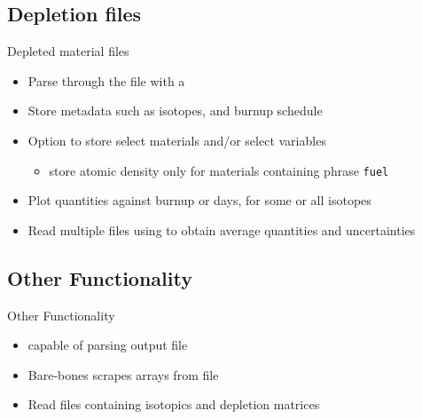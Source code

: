 \subsection{Depletion files}
\begin{frame}{Depleted material files}
    \begin{itemize}
        \item Parse through the file with a 
        \item Store metadata such as isotopes, and burnup schedule
        \item Option to store select materials and/or select variables
            \begin{itemize}
                \item store atomic density only for materials containing phrase \texttt{fuel} 
            \end{itemize}
        \item Plot quantities against burnup or days, for some or all isotopes
        \item Read multiple files using  to obtain average quantities and uncertainties
    \end{itemize}
\end{frame}

\subsection{Other Functionality}
\begin{frame}{Other Functionality}
    \begin{itemize}
        \item {} capable of parsing output file
        \item Bare-bones  scrapes arrays from file
        \item Read  files containing isotopics and depletion matrices
    \end{itemize}
\end{frame}
